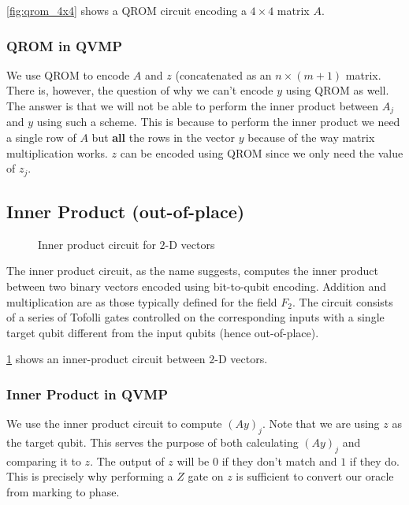 \documentclass[11pt]{article}
\theoremstyle{definition}
\theoremstyle{remark}
\begin{document}
\cref{fig:qrom_4x4} shows a QROM circuit encoding a $4 \times 4$ matrix $A$.

\subsubsection{QROM in QVMP}

We use QROM to encode $A$ and $z$ (concatenated as an $n \times (m+1)$ matrix.
There is, however, the question of why we can't encode $y$ using QROM as well.
The answer is that we will not be able to perform the inner product between
$A_j$ and $y$ using such a scheme. This is because to perform the inner product
we need a single row of $A$ but \textbf{all} the rows in the vector $y$ because
of the way matrix multiplication works. $z$ can be encoded using QROM since we
only need the value of $z_j$.

\subsection{Inner Product (out-of-place)}

\begin{figure}
  \centering
  
  \caption{Inner product circuit for $2$-D vectors}
  \label{fig:inner_product}
\end{figure}

The inner product circuit, as the name suggests, computes the inner product
between two binary vectors encoded using bit-to-qubit encoding. Addition and
multiplication are as those typically defined for the field $F_2$. The circuit
consists of a series of Tofolli gates controlled on the corresponding inputs
with a single target qubit different from the input qubits (hence out-of-place).

\cref{fig:inner_product} shows an inner-product circuit between $2$-D vectors.

\subsubsection{Inner Product in QVMP}

We use the inner product circuit to compute $(Ay)_j$. Note that we are using $z$
as the target qubit. This serves the purpose of both calculating $(Ay)_j$ and
comparing it to $z$. The output of $z$ will be $0$ if they don't match and $1$
if they do. This is precisely why performing a $Z$ gate on $z$ is sufficient to
convert our oracle from marking to phase.
\end{document}
